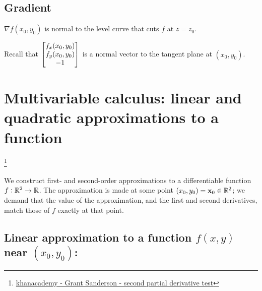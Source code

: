 

\subsection{Gradient}
$\nabla f(x_0, y_0)$ is normal to the level curve that cuts $f$ at $z = z_0$.

Recall that $\begin{bmatrix}f_x(x_0,y_0)\\f_y(x_0,y_0)\\-1\end{bmatrix}$ is a normal vector to the
tangent plane at $(x_0,y_0)$.


\section{Multivariable calculus: linear and quadratic approximations to a function}
\footnote{
  \href{https://www.khanacademy.org/math/multivariable-calculus/applications-of-multivariable-derivatives/optimizing-multivariable-functions/a/reasoning-behind-the-second-partial-derivative-test}{khanacademy - Grant Sanderson - second partial derivative test}
}


We construct first- and second-order approximations to a differentiable
function $f: \mathbb{R}^2 \rightarrow \mathbb{R}$. The approximation is made at some point
$(x_0, y_0) = \mathbf x_0 \in \mathbb{R}^2$; we demand that the value of the approximation, and the
first and second derivatives, match those of $f$ exactly at that point.

\subsection{Linear approximation to a function $f(x, y)$ near $(x_0, y_0)$:}

